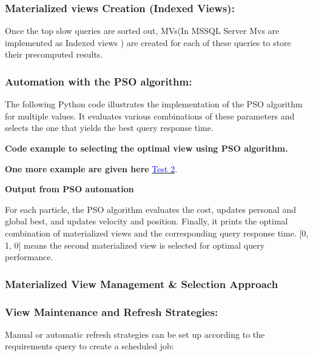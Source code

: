 \subsubsection{ Materialized views Creation (Indexed Views):} Once the top slow queries are sorted out, MVs(In MSSQL Server Mvs are implemented as Indexed views ) are created for each of these queries to store their precomputed results.\vspace{.4cm}

  

  


\subsubsection{Automation with the PSO algorithm:}
 The following Python code illustrates the implementation of the PSO algorithm for multiple values. It evaluates various combinations of these parameters and selects the one that yields the best query response time.\vspace{.4cm}
 


\textbf{Code example to selecting the optimal view using PSO algorithm.}

  \vspace{.4cm}

 

\textbf{One more example are given here } \hyperref[test:Test2]{\textcolor{blue}{Test 2}}.

\textbf{Output from PSO automation } 

  
  


 For each particle, the PSO algorithm evaluates the cost, updates personal and global best, and updates velocity and position. Finally, it prints the optimal combination of materialized views and the corresponding query response time.
 [0, 1, 0] means the second materialized view is selected for optimal query performance.
  


\subsubsection{Materialized View Management \& Selection Approach}
\subsubsection{View Maintenance and Refresh Strategies:} Manual or automatic refresh strategies can be set up according to the requirements query to create a scheduled job:

